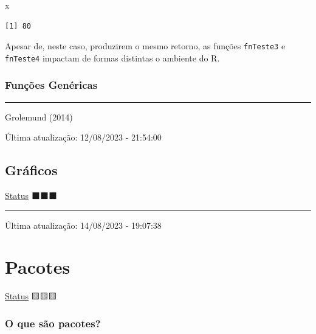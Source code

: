 \documentclass[
  letterpaper,
  DIV=11,
  numbers=noendperiod]{scrreprt}
\newenvironment{Shaded}{\begin{snugshade}}{\end{snugshade}}
\newcommand{\NormalTok}[1]{\textcolor[rgb]{0.00,0.23,0.31}{#1}}
\begin{document}
\begin{Shaded}
\begin{Highlighting}[]
\NormalTok{x}
\end{Highlighting}
\end{Shaded}

\begin{verbatim}
[1] 80
\end{verbatim}

Apesar de, neste caso, produzirem o mesmo retorno, as funções
\texttt{fnTeste3} e \texttt{fnTeste4} impactam de formas distintas o
ambiente do R.

\hypertarget{funuxe7uxf5es-genuxe9ricas}{%
\section{Funções Genéricas}\label{funuxe7uxf5es-genuxe9ricas}}

\begin{center}\rule{0.5\linewidth}{0.5pt}\end{center}

Grolemund (2014)

Última atualização: 12/08/2023 - 21:54:00

\hypertarget{gruxe1ficos}{%
\chapter{Gráficos}\label{gruxe1ficos}}

\protect\hyperlink{status-do-material}{Status} ⬛⬛⬛

\begin{center}\rule{0.5\linewidth}{0.5pt}\end{center}

Última atualização: 14/08/2023 - 19:07:38

\part{Pacotes}

\protect\hyperlink{status-do-material}{Status} 🟨🟨🟨

\hypertarget{o-que-suxe3o-pacotes}{%
\section*{O que são pacotes?}\label{o-que-suxe3o-pacotes}}

\end{document}
